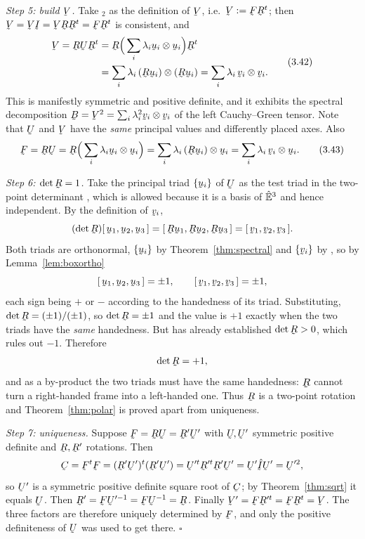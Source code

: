 \smallskip
\noindent
\emph{Step 5: build $\bV$.} Take $_{2}$ as the definition of $\bV$,
i.e.\ $\bV:=\bF\bR^{t}$; then $\bV=\bV\I=\bV\bR\bR^{t}=\bF\bR^{t}$ is
consistent, and
\begin{equation}
\begin{aligned}
   \bV=\bR\bU\bR^{t}
   &=\bR\Big(\sum_{i}\lambda_{i}\bu_{i}\otimes\bu_{i}\Big)\bR^{t}\\
   &=\sum_{i}\lambda_{i}\,(\bR\bu_{i})\otimes(\bR\bu_{i})
    =\sum_{i}\lambda_{i}\,\bv_{i}\otimes\bv_{i}.
\end{aligned}
   \tag{3.42}\label{eq:3.42}
\end{equation}
This is manifestly symmetric and positive definite, and it exhibits the
spectral decomposition $\bB=\bV^{2}=\sum_{i}\lambda_{i}^{2}\bv_{i}\otimes
\bv_{i}$ of the left Cauchy--Green tensor. Note that $\bU$ and $\bV$ have
the \emph{same} principal values and differently placed axes. Also
\begin{equation}
   \bF=\bR\bU=\bR\Big(\sum_{i}\lambda_{i}\bu_{i}\otimes\bu_{i}\Big)
     =\sum_{i}\lambda_{i}\,(\bR\bu_{i})\otimes\bu_{i}
     =\sum_{i}\lambda_{i}\,\bv_{i}\otimes\bu_{i}.
   \tag{3.43}\label{eq:3.43}
\end{equation}

\smallskip
\noindent
\emph{Step 6: $\det\bR=1$.} Take the principal triad $\{\bu_{i}\}$ of
$\bU$ as the test triad in the two-point determinant , which is
allowed because it is a basis of $\hat{\mathbb{E}}^{3}$ and hence independent. By the
definition  of $\bv_{i}$,
\[
   (\det\bR)\tbox{\bu_{1}}{\bu_{2}}{\bu_{3}}
   =\tbox{\bR\bu_{1}}{\bR\bu_{2}}{\bR\bu_{3}}
   =\tbox{\bv_{1}}{\bv_{2}}{\bv_{3}} .
\]
Both triads are orthonormal, $\{\bu_{i}\}$ by
Theorem~\ref{thm:spectral} and $\{\bv_{i}\}$ by , so by
Lemma~\ref{lem:boxortho}
\[
   \tbox{\bu_{1}}{\bu_{2}}{\bu_{3}}=\pm1,
   \qquad
   \tbox{\bv_{1}}{\bv_{2}}{\bv_{3}}=\pm1 ,
\]
each sign being $+$ or $-$ according to the handedness of its triad.
Substituting, $\det\bR=(\pm1)/(\pm1)$, so $\det\bR=\pm1$ and the value is
$+1$ exactly when the two triads have the \emph{same} handedness. But
 has already established $\det\bR>0$, which rules out $-1$.
Therefore
\[
   \det\bR=+1,
\]
and as a by-product the two triads must have the same handedness: $\bR$
cannot turn a right-handed frame into a left-handed one. Thus $\bR$ is a
two-point rotation and Theorem~\ref{thm:polar} is proved apart from
uniqueness.

\smallskip
\noindent
\emph{Step 7: uniqueness.} Suppose $\bF=\bR\bU=\bR'\bU'$ with $\bU,\bU'$
symmetric positive definite and $\bR,\bR'$ rotations. Then
\[
   \bC=\bF^{t}\bF=(\bR'\bU')^{t}(\bR'\bU')
      =\bU'^{t}\bR'^{t}\bR'\bU'=\bU'\hI\bU'=\bU'^{2},
\]
so $\bU'$ is a symmetric positive definite square root of $\bC$; by
Theorem~\ref{thm:sqrt} it equals $\bU$. Then
$\bR'=\bF\bU'^{-1}=\bF\bU^{-1}=\bR$. Finally $\bV'=\bF\bR'^{t}
=\bF\bR^{t}=\bV$. The three factors are therefore uniquely determined by
$\bF$, and only the positive definiteness of $\bU$ was used to get there.
\hfill$\square$

